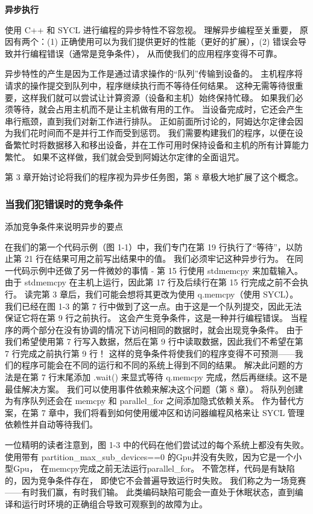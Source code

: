 \textbf{异步执行}

使用 C++ 和 SYCL 进行编程的异步特性不容忽视。 理解异步编程至关重要，
原因有两个：(1) 正确使用可以为我们提供更好的性能（更好的扩展），(2) 错误会导致并行编程错误（通常是竞争条件），
从而使我们的应用程序变得不可靠。

异步特性的产生是因为工作是通过请求操作的“队列”传输到设备的。 
主机程序将请求的操作提交到队列中，程序继续执行而不等待任何结果。 
这种无需等待很重要，这样我们就可以尝试让计算资源（设备和主机）始终保持忙碌。 
如果我们必须等待，就会占用主机而不是让主机做有用的工作。 当设备完成时，它还会产生串行瓶颈，直到我们对新工作进行排队。 
正如前面所讨论的，阿姆达尔定律会因为我们花时间而不是并行工作而受到惩罚。 
我们需要构建我们的程序，以便在设备繁忙时将数据移入和移出设备，并在工作可用时保持设备和主机的所有计算能力繁忙。 
如果不这样做，我们就会受到阿姆达尔定律的全面诅咒。

第 3 章开始讨论将我们的程序视为异步任务图，第 8 章极大地扩展了这个概念。

\subsubsection{当我们犯错误时的竞争条件}
{\color{red} 添加竞争条件来说明异步的要点}

在我们的第一个代码示例（图 1-1）中，我们专门在第 19 行执行了“等待”，以防止第 21 行在结果可用之前写出结果中的值。 
我们必须牢记这种异步行为。 在同一代码示例中还做了另一件微妙的事情 - 第 15 行使用 std\:\:memcpy 来加载输入。 
由于 std\:\:memcpy 在主机上运行，因此第 17 行及后续行在第 15 行完成之前不会执行。 
读完第 3 章后，我们可能会想将其更改为使用 q.memcpy（使用 SYCL）。 
我们已经在图 1-3 的第 7 行中做到了这一点。由于这是一个队列提交，因此无法保证它将在第 9 行之前执行。
这会产生竞争条件，这是一种并行编程错误。 当程序的两个部分在没有协调的情况下访问相同的数据时，就会出现竞争条件。 
由于我们希望使用第 7 行写入数据，然后在第 9 行中读取数据，因此我们不希望在第 7 行完成之前执行第 9 行！ 
这样的竞争条件将使我们的程序变得不可预测——我们的程序可能会在不同的运行和不同的系统上得到不同的结果。 
解决此问题的方法是在第 7 行末尾添加 .wait() 来显式等待 q.memcpy 完成，然后再继续。这不是最佳解决方案。 
我们可以使用事件依赖来解决这个问题（第 8 章）。 
将队列创建为有序队列还会在 memcpy 和 parallel\_for 之间添加隐式依赖关系。 
作为替代方案，在第 7 章中，我们将看到如何使用缓冲区和访问器编程风格来让 SYCL 管理依赖性并自动等待我们。

\begin{remark}[竞争条件并不总是导致程序失败]
	一位精明的读者注意到，图 1-3 中的代码在他们尝试过的每个系统上都没有失败。 
	使用带有 partition\_max\_sub\_devices==0 的Gpu并没有失败，因为它是一个小型Gpu，
	在memcpy完成之前无法运行parallel\_for。 不管怎样，代码是有缺陷的，因为竞争条件存在，
	即使它不会普遍导致运行时失败。 我们称之为一场竞赛——有时我们赢，有时我们输。 
	此类编码缺陷可能会一直处于休眠状态，直到编译和运行时环境的正确组合导致可观察到的故障为止。
\end{remark}

